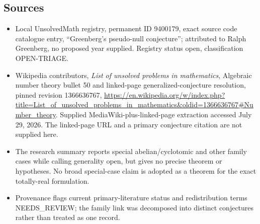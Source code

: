 \documentclass[11pt]{article}
\begin{document}
\subsection{Sources}
\begin{itemize}
\item Local UnsolvedMath registry, permanent ID 9400179, exact source code catalogue entry, ``Greenberg's pseudo-null conjecture''; attributed to Ralph Greenberg, no proposed year supplied. Registry status open, classification OPEN-TRIAGE.
\item Wikipedia contributors, \emph{List of unsolved problems in mathematics}, Algebraic number theory bullet 50 and linked-page generalized-conjecture resolution, pinned revision 1366636767, \url{https://en.wikipedia.org/w/index.php?title=List_of_unsolved_problems_in_mathematics&oldid=1366636767#Number_theory}. Supplied MediaWiki-plus-linked-page extraction accessed July 29, 2026. The linked-page URL and a primary conjecture citation are not supplied here.
\item The research summary reports special abelian/cyclotomic and other family cases while calling generality open, but gives no precise theorem or hypotheses. No broad special-case claim is adopted as a theorem for the exact totally-real formulation.
\item Provenance flags current primary-literature status and redistribution terms NEEDS\_REVIEW; the family link was decomposed into distinct conjectures rather than treated as one record.
\end{itemize}
\end{document}

